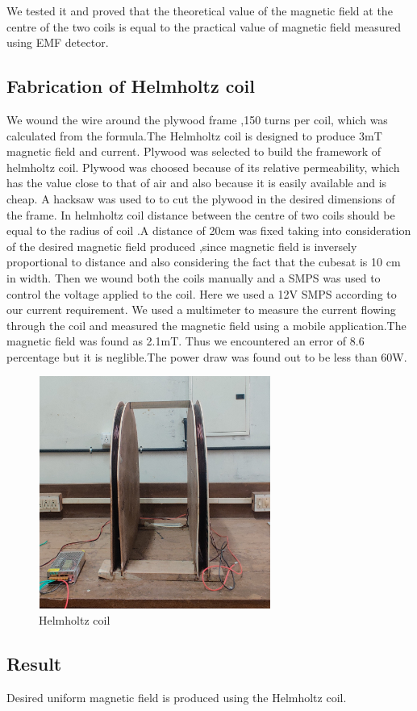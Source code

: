 \par We tested it and proved that the theoretical value of the magnetic field at the centre of the two coils is equal to the practical value of magnetic field measured using EMF detector.


\subsection{Fabrication of Helmholtz coil}

We wound the wire around the plywood frame ,150 turns per coil, which was calculated from the formula.The Helmholtz coil is designed to produce 3mT magnetic field and   current. Plywood was selected to build the framework of helmholtz coil. Plywood was choosed because of its relative permeability, which has the value close to that of air and also because it is easily available and is cheap. A hacksaw was used to to cut the plywood in the desired dimensions of the frame. In helmholtz coil distance between the centre of two coils should be equal to the radius of coil .A distance of 20cm was fixed taking into consideration of the desired  magnetic field produced ,since magnetic field is inversely proportional to distance and also considering the fact that the cubesat is 10 cm in width. Then we wound both the coils manually and a SMPS was used to control the voltage applied to the coil. Here we used a 12V SMPS according to our current requirement. We used a multimeter to measure the current flowing through the coil and measured the magnetic field using a mobile application.The magnetic field was found as 2.1mT. Thus we encountered an error of 8.6 percentage but it is neglible.The power draw was found out to be less than 60W.

\begin{figure}[h!]
	\centering
	\includegraphics[width=3in,height=3in]{images/1pic.jpg}
	\caption{Helmholtz coil}
	\label{fig-wVt}
\end{figure}


\subsection{Result}

Desired uniform magnetic field is produced using the Helmholtz coil.
